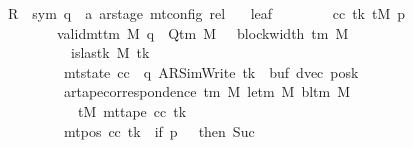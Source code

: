 \begin{isabellebody}
\ \ \ \ \ R{\isacharprime}{\kern0pt}\ {\isacharcolon}{\kern0pt}{\isacharcolon}{\kern0pt}\ {\isachardoublequoteopen}{\isacharparenleft}{\kern0pt}sym{}{\isacharcomma}{\kern0pt}\ {\isacharprime}{\kern0pt}q\ {\isasymtimes}\ {\isacharprime}{\kern0pt}a\ ar{\isacharunderscore}{\kern0pt}stage{\isacharparenright}{\kern0pt}\ mt{\isacharunderscore}{\kern0pt}config\ rel{\isachardoublequoteclose}\isanewline
\ \ \ leaf{\isacharcolon}{\kern0pt}\isanewline
\ \ \ \ \ \ \ \ {\isachardoublequoteopen}{\isasymAnd}cc\ tk{\isacharprime}{\kern0pt}\ tM{\isacharprime}{\kern0pt}\ p{\isacharprime}{\kern0pt}{\isachardot}{\kern0pt}\isanewline
\ \ \ \ \ \ \ \ \ \ \ {\isasymlbrakk}\ valid{\isacharunderscore}{\kern0pt}mttm\ M{\isacharsemicolon}{\kern0pt}\ q\ {\isasymin}\ Q{\isacharunderscore}{\kern0pt}tm\ M{\isacharsemicolon}{\kern0pt}\ {}\ {\isasymle}\ block{\isacharunderscore}{\kern0pt}width\ {\isacharparenleft}{\kern0pt}{\isasymGamma}{\isacharunderscore}{\kern0pt}tm\ M{\isacharparenright}{\kern0pt}{\isacharsemicolon}{\kern0pt}\isanewline
\ \ \ \ \ \ \ \ \ \ \ \ \ {\isasymnot}\ is{\isacharunderscore}{\kern0pt}last{\isacharunderscore}{\kern0pt}k\ M\ tk{\isacharprime}{\kern0pt}{\isacharsemicolon}{\kern0pt}\isanewline
\ \ \ \ \ \ \ \ \ \ \ \ \ mt{\isacharunderscore}{\kern0pt}state\ cc\ {\isacharequal}{\kern0pt}\ {\isacharparenleft}{\kern0pt}q{\isacharcomma}{\kern0pt}\ AR{\isacharunderscore}{\kern0pt}SimWrite{\isacharcomma}{\kern0pt}\ tk{\isacharprime}{\kern0pt}{\isacharcomma}{\kern0pt}\ {}{\isacharcomma}{\kern0pt}\ buf{\isacharcomma}{\kern0pt}\ dvec{\isacharcomma}{\kern0pt}\ posk{\isacharparenright}{\kern0pt}{\isacharsemicolon}{\kern0pt}\isanewline
\ \ \ \ \ \ \ \ \ \ \ \ \ ar{\isacharunderscore}{\kern0pt}tape{\isacharunderscore}{\kern0pt}correspondence\ {\isacharparenleft}{\kern0pt}{\isasymGamma}{\isacharunderscore}{\kern0pt}tm\ M{\isacharparenright}{\kern0pt}\ {\isacharparenleft}{\kern0pt}le{\isacharunderscore}{\kern0pt}tm\ M{\isacharparenright}{\kern0pt}\ {\isacharparenleft}{\kern0pt}bl{\isacharunderscore}{\kern0pt}tm\ M{\isacharparenright}{\kern0pt}\isanewline
\ \ \ \ \ \ \ \ \ \ \ \ \ \ \ tM{\isacharprime}{\kern0pt}\ {\isacharparenleft}{\kern0pt}mt{\isacharunderscore}{\kern0pt}tape\ cc\ tk{\isacharprime}{\kern0pt}{\isacharparenright}{\kern0pt}{\isacharsemicolon}{\kern0pt}\isanewline
\ \ \ \ \ \ \ \ \ \ \ \ \ mt{\isacharunderscore}{\kern0pt}pos\ cc\ tk{\isacharprime}{\kern0pt}\ {\isacharequal}{\kern0pt}\ {\isacharparenleft}{\kern0pt}if\ p{\isacharprime}{\kern0pt}\ {\isacharequal}{\kern0pt}\ {}\ then\ Suc\ {}\isanewline

\end{isabellebody}

